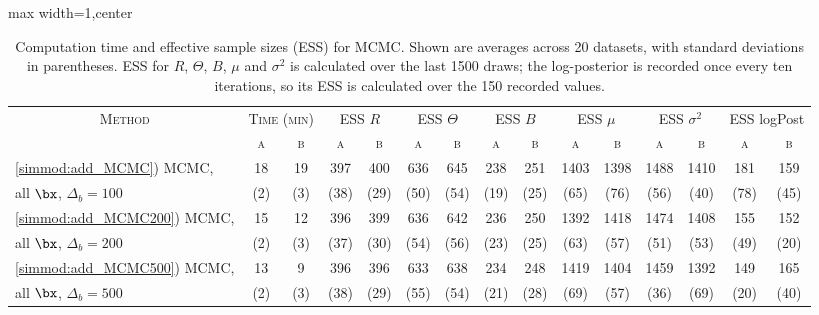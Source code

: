 \begin{table}[th]
\caption{Computation time and effective sample sizes (ESS) for MCMC. Shown are averages across 20 datasets, with standard deviations in parentheses. ESS for $R$, $\Theta$, $B$, $\mu$ and $\sigma^2$ is calculated over the last 1500 draws; the log-posterior is recorded once every ten iterations, so its ESS is calculated over the 150 recorded values.}
\centering
\small
\begin{adjustbox}{max width=1\textwidth,center}
\begin{tabular}{|l|cc|cc|cc|cc|cc|cc|cc|}
\hline
\multicolumn{1}{|c|}{\textsc{Method}}
& \multicolumn{2}{c|}{\textsc{Time (min)}}
& \multicolumn{2}{c|}{\textsc{ESS} $R$}
& \multicolumn{2}{c|}{\textsc{ESS} $\Theta$}
& \multicolumn{2}{c|}{\textsc{ESS} $B$}
& \multicolumn{2}{c|}{\textsc{ESS} $\mu$}
& \multicolumn{2}{c|}{\textsc{ESS} $\sigma^2$}
& \multicolumn{2}{c|}{\textsc{ESS} logPost}\\
& \textsc{a} & \textsc{b} & \textsc{a} & \textsc{b} & \textsc{a} & \textsc{b} & \textsc{a} & \textsc{b} & \textsc{a} & \textsc{b} & \textsc{a} & \textsc{b} & \textsc{a} & \textsc{b} \\
\hline
\ref{simmod:add_MCMC}) MCMC,
& 18 & 19 & 397 & 400 & 636 & 645 & 238 & 251 & 1403 & 1398 & 1488 & 1410 & 181 & 159 \\
all $\bx$, $\Delta_b=100$
& {\scriptsize (2)} & {\scriptsize (3)} & {\scriptsize (38)} & {\scriptsize (29)} & {\scriptsize (50)} & {\scriptsize (54)} & {\scriptsize (19)} & {\scriptsize (25)} & {\scriptsize (65)} & {\scriptsize (76)} & {\scriptsize (56)} & {\scriptsize (40)} & {\scriptsize (78)} & {\scriptsize (45)} \\
\hline
\ref{simmod:add_MCMC200}) MCMC,
& 15 & 12 & 396 & 399 & 636 & 642 & 236 & 250 & 1392 & 1418 & 1474 & 1408 & 155 & 152 \\
all $\bx$, $\Delta_b=200$
& {\scriptsize (2)} & {\scriptsize (3)} & {\scriptsize (37)} & {\scriptsize (30)} & {\scriptsize (54)} & {\scriptsize (56)} & {\scriptsize (23)} & {\scriptsize (25)} & {\scriptsize (63)} & {\scriptsize (57)} & {\scriptsize (51)} & {\scriptsize (53)} & {\scriptsize (49)} & {\scriptsize (20)} \\
\hline
\ref{simmod:add_MCMC500}) MCMC,
& 13 & 9 & 396 & 396 & 633 & 638 & 234 & 248 & 1419 & 1404 & 1459 & 1392 & 149 & 165 \\
all $\bx$, $\Delta_b=500$
& {\scriptsize (2)} & {\scriptsize (3)} & {\scriptsize (38)} & {\scriptsize (29)} & {\scriptsize (55)} & {\scriptsize (54)} & {\scriptsize (21)} & {\scriptsize (28)} & {\scriptsize (69)} & {\scriptsize (57)} & {\scriptsize (36)} & {\scriptsize (69)} & {\scriptsize (20)} & {\scriptsize (40)} \\
\hline
\end{tabular}
\end{adjustbox}
\label{tab:mcmc_results}
\end{table}
